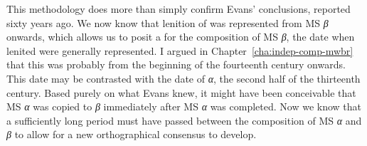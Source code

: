 This methodology does more than simply confirm Evans' conclusions, reported sixty years ago. We now know  that lenition of  was represented from MS \textit{β} onwards, which allows us to posit a  for the composition of MS \textit{β}, \ie the date when lenited  were generally represented. I argued in Chapter~\ref{cha:indep-comp-mwbr} that this was probably from the beginning of the fourteenth century onwards. This date may be contrasted with the date of \textit{α}, the second half of the thirteenth century. Based purely on what Evans knew, it might have been conceivable that MS \textit{α} was copied to \textit{β} immediately after  MS \textit{α} was completed. Now we know that a sufficiently long period must have passed between the composition of MS \textit{α} and \textit{β} to allow for a new orthographical consensus to develop. 

